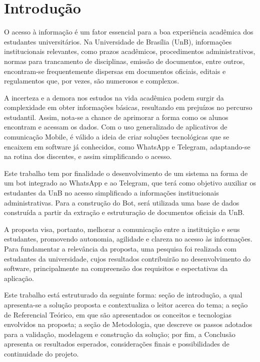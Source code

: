 \chapter[Introdução]{Introdução}

O acesso à informação é um fator essencial para a boa experiência acadêmica dos estudantes universitários. Na Universidade de Brasília (UnB), informações institucionais relevantes, como prazos acadêmicos, procedimentos administrativos, normas para trancamento de disciplinas, emissão de documentos, entre outros, encontram-se frequentemente dispersas em documentos oficiais, editais e regulamentos que, por vezes, são numerosos e complexos.                                                                        

A incerteza e a demora nos estudos na vida acadêmica podem surgir da complexidade em obter informações básicas, resultando em prejuízos no percurso estudantil. Assim, nota-se a chance de aprimorar a forma como os alunos encontram e acessam os dados. Com o uso generalizado de aplicativos de comunicação Mobile, é válido a ideia de criar soluções tecnológicas que se encaixem em software já conhecidos, como WhatsApp e Telegram, adaptando-se na rotina dos discentes, e assim simplificando o acesso.


Este trabalho tem por finalidade o desenvolvimento de um sistema na forma de um bot integrado ao WhatsApp e ao Telegram, que terá como objetivo auxiliar os estudantes da UnB no acesso simplificado a informações institucionais administrativas. Para a construção do Bot, será utilizada uma base de dados construída a partir da extração e estruturação de documentos oficiais da UnB.

A proposta visa, portanto, melhorar a comunicação entre a instituição e seus estudantes, promovendo autonomia, agilidade e clareza no acesso às informações. Para fundamentar a relevância da proposta, uma pesquisa foi realizada com estudantes da universidade, cujos resultados contribuirão no desenvolvimento do software, principalmente na compreensão dos requisitos e espectativas da aplicação.

Este trabalho está estruturado da seguinte forma: seção de introdução, a qual apresenta-se a solução proposta e contextualiza o leitor acerca do tema; a seção de Referencial Teórico, em que são apresentados os conceitos e tecnologias envolvidos na proposta; a seção de Metodologia, que descreve os passos adotados para a validação, modelagem e construção da solução; por fim, a Conclusão apresenta os resultados esperados, considerações finais e possibilidades de continuidade do projeto.

